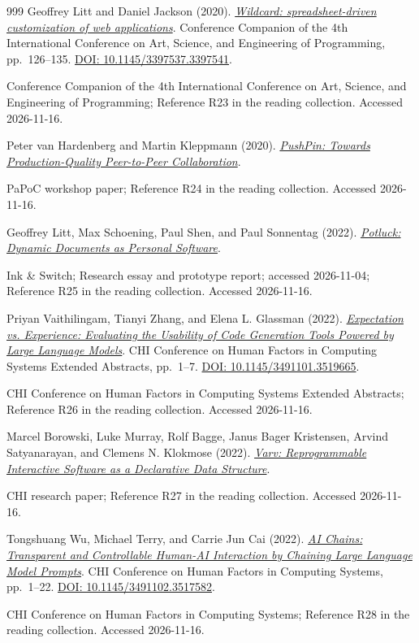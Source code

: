 \documentclass[11pt,letterpaper]{article}
\begin{document}
\begin{thebibliography}{999}
Geoffrey Litt and Daniel Jackson (2020).
\href{https://doi.org/10.1145/3397537.3397541}{\emph{Wildcard: spreadsheet-driven customization of web applications}}.
Conference Companion of the 4th International Conference on Art, Science, and Engineering of Programming, pp.~126--135.
\href{https://doi.org/10.1145/3397537.3397541}{DOI: 10.1145/3397537.3397541}.
\par {\small Conference Companion of the 4th International Conference on Art, Science, and Engineering of Programming; Reference R23 in the reading collection.}
{\small Accessed 2026-11-16.}

Peter van Hardenberg and Martin Kleppmann (2020).
\href{https://www.inkandswitch.com/pushpin/}{\emph{PushPin: Towards Production-Quality Peer-to-Peer Collaboration}}.
\par {\small PaPoC workshop paper; Reference R24 in the reading collection.}
{\small Accessed 2026-11-16.}

Geoffrey Litt, Max Schoening, Paul Shen, and Paul Sonnentag (2022).
\href{https://www.inkandswitch.com/potluck/}{\emph{Potluck: Dynamic Documents as Personal Software}}.
\par {\small Ink \& Switch; Research essay and prototype report; accessed 2026-11-04; Reference R25 in the reading collection.}
{\small Accessed 2026-11-16.}

Priyan Vaithilingam, Tianyi Zhang, and Elena L. Glassman (2022).
\href{https://doi.org/10.1145/3491101.3519665}{\emph{Expectation vs. Experience: Evaluating the Usability of Code Generation Tools Powered by Large Language Models}}.
CHI Conference on Human Factors in Computing Systems Extended Abstracts, pp.~1--7.
\href{https://doi.org/10.1145/3491101.3519665}{DOI: 10.1145/3491101.3519665}.
\par {\small CHI Conference on Human Factors in Computing Systems Extended Abstracts; Reference R26 in the reading collection.}
{\small Accessed 2026-11-16.}

Marcel Borowski, Luke Murray, Rolf Bagge, Janus Bager Kristensen, Arvind Satyanarayan, and Clemens N. Klokmose (2022).
\href{https://vis.csail.mit.edu/pubs/varv/}{\emph{Varv: Reprogrammable Interactive Software as a Declarative Data Structure}}.
\par {\small CHI research paper; Reference R27 in the reading collection.}
{\small Accessed 2026-11-16.}

Tongshuang Wu, Michael Terry, and Carrie Jun Cai (2022).
\href{https://doi.org/10.1145/3491102.3517582}{\emph{AI Chains: Transparent and Controllable Human-AI Interaction by Chaining Large Language Model Prompts}}.
CHI Conference on Human Factors in Computing Systems, pp.~1--22.
\href{https://doi.org/10.1145/3491102.3517582}{DOI: 10.1145/3491102.3517582}.
\par {\small CHI Conference on Human Factors in Computing Systems; Reference R28 in the reading collection.}
{\small Accessed 2026-11-16.}


\end{thebibliography}
\end{document}
